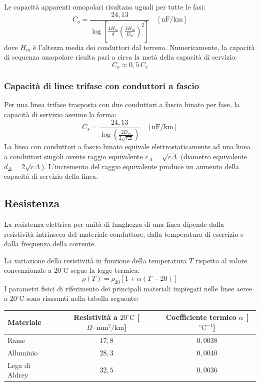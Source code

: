 Le capacità apparenti omopolari risultano uguali per tutte le fasi:
\[C_o = \frac{24{,}13}{\log\left[\frac{4 H_m}{d} \left(\frac{2 H_m}{D_m}\right)^2\right]} \quad [\text{nF/km}]\]
dove $H_m$ è l'altezza media dei conduttori dal terreno. Numericamente, la capacità di sequenza omopolare risulta pari a circa la metà della capacità di servizio:
\[C_o \approx 0{,}5 \, C_s\]

\subsubsection{Capacità di linee trifase con conduttori a fascio}
Per una linea trifase trasposta con due conduttori a fascio binato per fase, la capacità di servizio assume la forma:
\[C_s = \frac{24{,}13}{\log\left(\frac{2 D_m}{2 \sqrt{r \Delta}}\right)} \quad [\text{nF/km}]\]
La linea con conduttori a fascio binato equivale elettrostaticamente ad una linea a conduttori singoli avente raggio equivalente $r_\Delta = \sqrt{r \Delta}$ (diametro equivalente $d_\Delta = 2\sqrt{r\Delta}$). L'incremento del raggio equivalente produce un aumento della capacità di servizio della linea.

\subsection{Resistenza}
La resistenza elettrica per unità di lunghezza di una linea dipende dalla resistività intrinseca del materiale conduttore, dalla temperatura di esercizio e dalla frequenza della corrente.

La variazione della resistività in funzione della temperatura $T$ rispetto al valore convenzionale a $20^\circ\text{C}$ segue la legge termica:
\[\rho(T) = \rho_{20} [1 + \alpha (T - 20)]\]
I parametri fisici di riferimento dei principali materiali impiegati nelle linee aeree a $20^\circ\text{C}$ sono riassunti nella tabella seguente:

\begin{center}
\begin{tabular}{|l|c|c|}
\hline
\textbf{Materiale} & \textbf{Resistività a $20^\circ\text{C}$ [$\Omega\cdot\text{mm}^2/\text{km}$]} & \textbf{Coefficiente termico $\alpha$ [$^\circ\text{C}^{-1}$]} \\
\hline
Rame & $17{,}8$ & $0{,}0038$ \\
Alluminio & $28{,}3$ & $0{,}0040$ \\
Lega di Aldrey & $32{,}5$ & $0{,}0036$ \\
\hline
\end{tabular}
\end{center}


